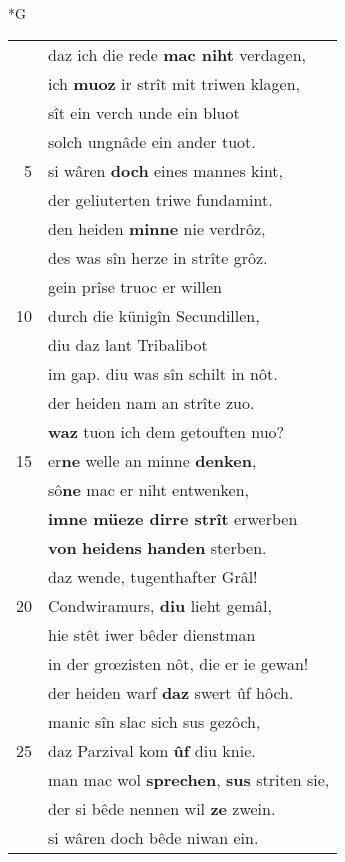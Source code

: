 \documentclass[8pt,a4paper,notitlepage]{article}
\begin{document}
\begin{table}[ht]
\begin{minipage}[t]{0.5\linewidth}
\small
\begin{center}*G
\end{center}
\begin{tabular}{rl}
 & daz ich die rede \textbf{mac niht} verdagen,\\ 
 & ich \textbf{muoz} ir strît mit triwen klagen,\\ 
 & sît ein verch unde ein bluot\\ 
 & solch ungnâde ein ander tuot.\\ 
5 & si wâren \textbf{doch} eines mannes kint,\\ 
 & der geliuterten triwe fundamint.\\ 
 & den heiden \textbf{minne} nie verdrôz,\\ 
 & des was sîn herze in strîte grôz.\\ 
 & gein prîse truoc er willen\\ 
10 & durch die künigîn Secundillen,\\ 
 & diu daz lant Tribalibot\\ 
 & im gap. diu was sîn schilt in nôt.\\ 
 & der heiden nam an strîte zuo.\\ 
 & \textbf{waz} tuon ich dem getouften nuo?\\ 
15 & er\textbf{ne} welle an minne \textbf{denken},\\ 
 & sô\textbf{ne} mac er niht entwenken,\\ 
 & \textbf{imne müeze dirre strît} erwerben\\ 
 & \textbf{von} \textbf{heidens} \textbf{handen} sterben.\\ 
 & daz wende, tugenthafter Grâl!\\ 
20 & Condwiramurs, \textbf{diu} lieht gemâl,\\ 
 & hie stêt iwer bêder dienstman\\ 
 & in der grœzisten nôt, die er ie gewan!\\ 
 & der heiden warf \textbf{daz} swert ûf hôch.\\ 
 & manic sîn slac sich sus gezôch,\\ 
25 & daz Parzival kom \textbf{ûf} diu knie.\\ 
 & man mac wol \textbf{sprechen}, \textbf{sus} striten sie,\\ 
 & der si bêde nennen wil \textbf{ze} zwein.\\ 
 & si wâren doch bêde niwan ein.\\ 

\end{tabular}
\end{minipage}
\end{table}
\end{document}
